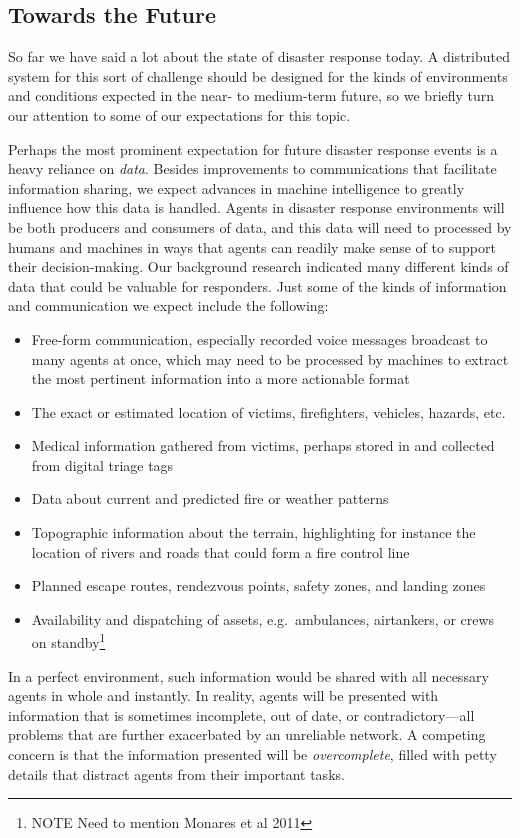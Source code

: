 \documentclass[]             %
{NASA}                       %
\theoremstyle{definition}
\providecommand{\tightlist}{%
  \setlength{\itemsep}{0pt}\setlength{\parskip}{0pt}}
\begin{document}
\subsection{Towards the Future}
\label{towards-the-future}
So far we have said a lot about the state of disaster response
today. A distributed system for this sort of challenge should be
designed for the kinds of environments and conditions expected in the
near- to medium-term future, so we briefly turn our attention to some
of our expectations for this topic.

Perhaps the most prominent expectation for future disaster response
events is a heavy reliance on \emph{data}. Besides improvements to
communications that facilitate information sharing, we expect advances
in machine intelligence to greatly influence how this data is
handled. Agents in disaster response environments will be both
producers and consumers of data, and this data will need to processed
by humans and machines in ways that agents can readily make sense of
to support their decision-making. Our background research indicated
many different kinds of data that could be valuable for
responders. Just some of the kinds of information and communication we
expect include the following:
\begin{itemize}
  \tightlist
\item
  Free-form communication, especially recorded voice messages
  broadcast to many agents at once, which may need to be processed by
  machines to extract the most pertinent information into a more
  actionable format
\item
  The exact or estimated location of victims, firefighters, vehicles,
  hazards, etc.
\item
  Medical information gathered from victims, perhaps stored in and
  collected from digital triage tags\citationneeded
\item
  Data about current and predicted fire or weather patterns
\item
  Topographic information about the terrain, highlighting for instance
  the location of rivers and roads that could form a fire control line
\item
  Planned escape routes, rendezvous points, safety zones, and landing
  zones
\item
  Availability and dispatching of assets, e.g.~ambulances, airtankers,
  or crews on standby\footnote{NOTE Need to mention Monares et al 2011}
\end{itemize}
In a perfect environment, such information would be shared with all
necessary agents in whole and instantly. In reality, agents will be
presented with information that is sometimes incomplete, out of date,
or contradictory---all problems that are further exacerbated by an
unreliable network. A competing concern is that the information
presented will be \emph{overcomplete}, filled with petty details that
distract agents from their important tasks.
\end{document}

